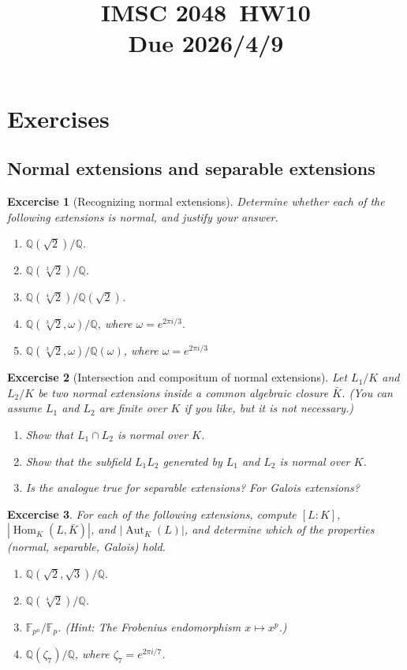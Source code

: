 \documentclass{article}
\title{IMSC 2048\ HW10 \\ Due 2026/4/9}
\newtheorem{exer}{Excercise}
\newcommand{\Q}{\mathbb{Q}}
\newcommand{\F}{\mathbb{F}}
\newcommand{\Aut}{\operatorname{Aut}}
\newcommand{\Hom}{\operatorname{Hom}}
\begin{document}
\maketitle

\section{Exercises}
\subsection*{Normal extensions and separable extensions}

\begin{exer}[Recognizing normal extensions]
Determine whether each of the following extensions is normal, and justify your answer.
\begin{enumerate}
  \item $\Q(\sqrt{2})/\Q$.
  \item $\Q(\sqrt[3]{2})/\Q$.
  \item $\Q(\sqrt[4]{2})/\Q(\sqrt{2})$.

  \item $\Q(\sqrt[3]{2},\omega)/\Q$, where $\omega=e^{2\pi i/3}$.
  \item $\Q(\sqrt[3]{2},\omega)/\Q(\omega)$, where $\omega=e^{2\pi i/3}$
  

\end{enumerate}
\end{exer}

\begin{exer}[Intersection and compositum of normal extensions]\label{exer:normal-cap-comp}
Let $L_1/K$ and $L_2/K$ be two normal extensions inside a common algebraic closure $\bar K$. (You can assume $L_1$ and $L_2$ are finite over $K$ if you like, but it is not necessary.)
\begin{enumerate}
  \item Show that $L_1\cap L_2$ is normal over $K$.
  \item Show that the subfield $L_1L_2$ generated by $L_1$ and $L_2$ is normal over $K$.
  \item Is the analogue true for separable extensions? For Galois extensions?
\end{enumerate}
\end{exer}


\begin{exer}
For each of the following extensions, compute $[L:K]$, $|\Hom_K(L,\bar K)|$, and $|\Aut_K(L)|$, and  determine which of the properties (normal, separable, Galois) hold.
\begin{enumerate}
    \item $\Q(\sqrt{2}, \sqrt{3}) / \Q$.
    \item $\Q(\sqrt[4]{2}) / \Q$.
    \item $\F_{p^n} / \F_p$. (Hint: The Frobenius endomorphism $x \mapsto x^p$.)
    
    \item $\Q(\zeta_7)/\Q$, where $\zeta_7=e^{2\pi i/7}$.
\end{enumerate}
\end{exer}
\end{document}
